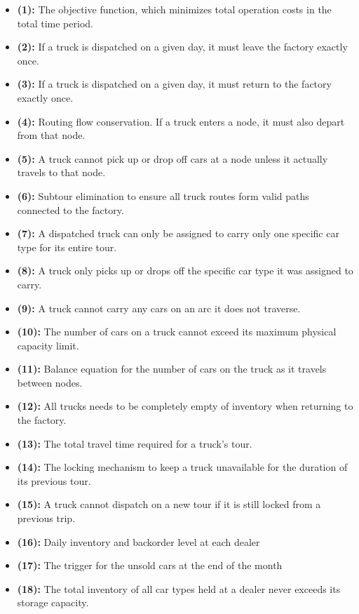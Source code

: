 \documentclass{article}
\begin{document}
\begin{itemize}
    \item \textbf{(1):} The objective function, which minimizes total operation costs in the total time period.
    \item \textbf{(2):} If a truck is dispatched on a given day, it must leave the factory exactly once.
    \item \textbf{(3):} If a truck is dispatched on a given day, it must return to the factory exactly once.
    \item \textbf{(4):} Routing flow conservation. If a truck enters a node, it must also depart from that node.
    \item \textbf{(5):} A truck cannot pick up or drop off cars at a node unless it actually travels to that node.
    \item \textbf{(6):} Subtour elimination to ensure all truck routes form valid paths connected to the factory.
    \item \textbf{(7):} A dispatched truck can only be assigned to carry only one specific car type for its entire tour.
    \item \textbf{(8):} A truck only picks up or drops off the specific car type it was assigned to carry.
    \item \textbf{(9):} A truck cannot carry any cars on an arc it does not traverse.
    \item \textbf{(10):} The number of cars on a truck cannot exceed its maximum physical capacity limit.
    \item \textbf{(11):} Balance equation for the number of cars on the truck as it travels between nodes.
    \item \textbf{(12):} All trucks needs to be completely empty of inventory when returning to the factory.
    \item \textbf{(13):} The total travel time required for a truck's tour.
    \item \textbf{(14):} The locking mechanism to keep a truck unavailable for the duration of its previous tour.
    \item \textbf{(15):} A truck cannot dispatch on a new tour if it is still locked from a previous trip.
    \item \textbf{(16):} Daily inventory and backorder level at each dealer
    \item \textbf{(17):} The trigger for the unsold cars at the end of the month
    \item \textbf{(18):} The total inventory of all car types held at a dealer never exceeds its storage capacity.
\end{itemize}
\end{document}
